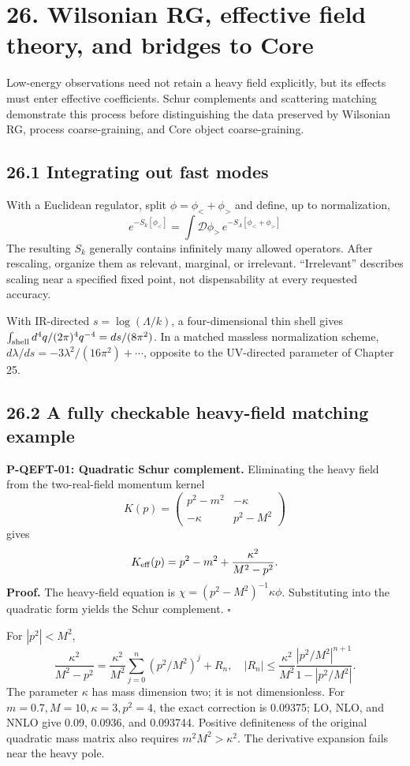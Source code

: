 \documentclass[
  11pt,
  oneside]{book}
\begin{document}
\chapter{26. Wilsonian RG, effective field theory, and bridges to
Core}\label{ch-26}

Low-energy observations need not retain a heavy field explicitly, but
its effects must enter effective coefficients. Schur complements and
scattering matching demonstrate this process before distinguishing the
data preserved by Wilsonian RG, process coarse-graining, and Core object
coarse-graining.

\section{26.1 Integrating out fast modes}

With a Euclidean regulator, split \(\phi=\phi_<+\phi_>\) and define, up
to normalization, \[
e^{-S_k[\phi_<]}=\int\mathcal D\phi_>\,e^{-S_\Lambda[\phi_<+\phi_>]}
\] The resulting \(S_k\) generally contains infinitely many allowed
operators. After rescaling, organize them as relevant, marginal, or
irrelevant. ``Irrelevant'' describes scaling near a specified fixed
point, not dispensability at every requested accuracy.

With IR-directed \(s=\log(\Lambda/k)\), a four-dimensional thin shell
gives \(\int_{\rm shell}d^4q/(2\pi)^4q^{-4}=ds/(8\pi^2)\). In a matched
massless normalization scheme,
\(d\lambda/ds=-3\lambda^2/(16\pi^2)+\cdots\), opposite to the
UV-directed parameter of Chapter 25.

\section{26.2 A fully checkable heavy-field matching example}

\label{p-qeft-01}{}

\textbf{P-QEFT-01: Quadratic Schur complement.} Eliminating the heavy
field from the two-real-field momentum kernel \[
K(p)=\begin{pmatrix}p^2-m^2&-\kappa\\-\kappa&p^2-M^2\end{pmatrix}
\] gives \[
K_{\rm eff}(p)=p^2-m^2+\frac{\kappa^2}{M^2-p^2}.
\] \textbf{Proof.} The heavy-field equation is
\(\chi=(p^2-M^2)^{-1}\kappa\phi\). Substituting into the quadratic form
yields the Schur complement. \(\square\)

For \(|p^2|<M^2\), \[
\frac{\kappa^2}{M^2-p^2}
=\frac{\kappa^2}{M^2}\sum_{j=0}^{n}(p^2/M^2)^j+R_n,\quad
|R_n|\le\frac{\kappa^2}{M^2}
\frac{|p^2/M^2|^{n+1}}{1-|p^2/M^2|}.
\] The parameter \(\kappa\) has mass dimension two; it is not
dimensionless. For \(m=0.7,M=10,\kappa=3,p^2=4\), the exact correction
is 0.09375; LO, NLO, and NNLO give 0.09, 0.0936, and 0.093744. Positive
definiteness of the original quadratic mass matrix also requires
\(m^2M^2>\kappa^2\). The derivative expansion fails near the heavy pole.
\end{document}

